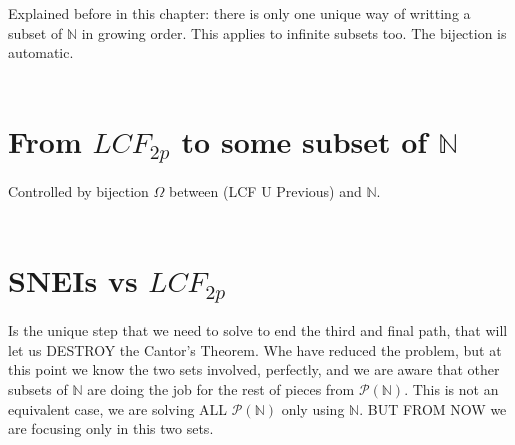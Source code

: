 		\noindent
		Explained before in this chapter: there is only one unique way of writting a subset of $\mathbb{N}$ in growing order. This applies to infinite subsets too. The bijection is automatic.
		\\\\
		
	\section{ From $LCF_{2p}$ to some subset of $\mathbb{N}$ }
	
		\noindent
		Controlled by bijection $\Omega$ between (LCF U Previous) and $\mathbb{N}$.
		\\\\
		
	\section{ SNEIs vs $LCF_{2p}$ }
	
		\noindent
		Is the unique step that we need to solve to end the third and final path, that will let us DESTROY the Cantor's Theorem. Whe have reduced the problem, but at this point we know the two sets involved, perfectly, and we are aware that other subsets of $\mathbb{N}$ are doing the job for the rest of pieces from $\mathcal{P(\mathbb{N})}$. This is not an equivalent case, we are solving ALL $\mathcal{P(\mathbb{N})}$ only using $\mathbb{N}$. BUT FROM NOW we are focusing only in this two sets.
		\\\\
		
		
	
\newpage
